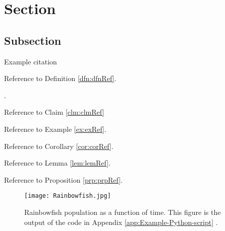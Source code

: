 \section{Section}\label{sse:Section}

\subsection{Subsection}\label{sss:Subsection}

Example citation \citep{baarslag2015learning}


Reference to Definition \ref{dfn:dfnRef}.


.


Reference to Claim \ref{clm:clmRef}


Reference to Example \ref{ex:exRef}.




Reference to Corollary \ref{cor:corRef}.


Reference to Lemma \ref{lem:lemRef}.


Reference to Proposition \ref{prp:prpRef}.

\begin{figure}[H]
    \centering
    \texttt{[image: Rainbowfish.jpg]}
    \caption[Rainbowfish population as a function of time]{Rainbowfish population as a function of time.
        This figure is the output of the code in Appendix \ref{app:Example-Python-script}  \citep{tudelftopencourseware}.}
    \label{fig:Rainbowfish}
\end{figure}